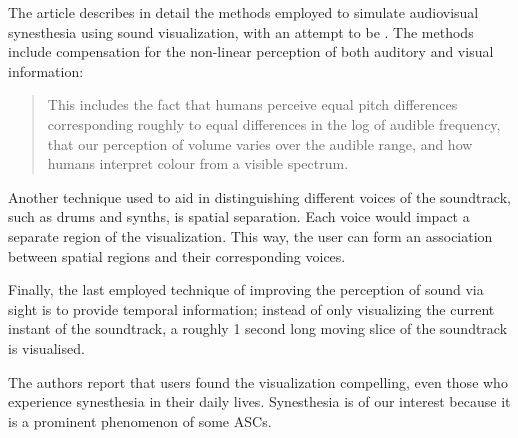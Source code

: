 The article describes in detail the methods employed to simulate audiovisual synesthesia using sound visualization, with an attempt to be . The methods include compensation for the non-linear perception of both auditory and visual information:

\begin{quote}
    This includes the fact that humans perceive equal pitch differences corresponding roughly to equal differences in the log of audible frequency, that our perception of volume varies over the audible range, and how humans interpret colour from a visible spectrum.
\end{quote}

Another technique used to aid in distinguishing different voices of the soundtrack, such as drums and synths, is spatial separation. Each voice would impact a separate region of the visualization. This way, the user can form an association between spatial regions and their corresponding voices.

Finally, the last employed technique of improving the perception of sound via sight is to provide temporal information; instead of only visualizing the current instant of the soundtrack, a roughly 1 second long moving slice of the soundtrack is visualised.

The authors report that users found the visualization compelling, even those who experience synesthesia in their daily lives. Synesthesia is of our interest because it is a prominent phenomenon of some \acp{ASC}.

